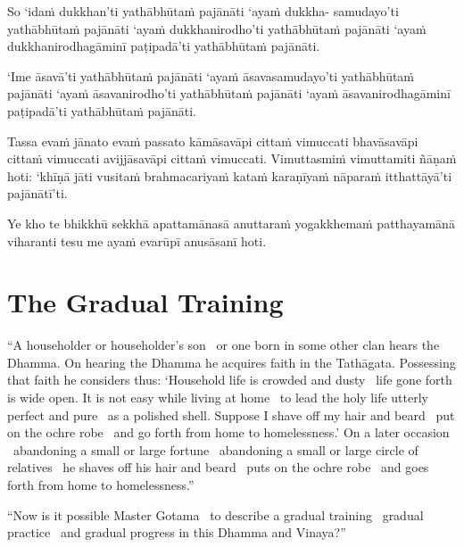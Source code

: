 So ‘idaṁ dukkhan’ti yathābhūtaṁ pajānāti ‘ayaṁ dukkha- samudayo’ti yathābhūtaṁ pajānāti ‘ayaṁ dukkhanirodho’ti yathābhūtaṁ pajānāti ‘ayaṁ dukkhanirodhagāminī paṭipadā’ti yathābhūtaṁ pajānāti.

‘Ime āsavā’ti yathābhūtaṁ pajānāti ‘ayaṁ āsavasamudayo’ti yathābhūtaṁ pajānāti ‘ayaṁ āsavanirodho’ti yathābhūtaṁ pajānāti ‘ayaṁ āsavanirodhagāminī paṭipadā’ti yathābhūtaṁ pajānāti.

Tassa evaṁ jānato evaṁ passato kāmāsavāpi cittaṁ vimuccati bhavāsavāpi cittaṁ vimuccati avijjāsavāpi cittaṁ vimuccati. Vimuttasmiṁ vimuttamiti ñāṇaṁ hoti: ‘khīṇā jāti vusitaṁ brahmacariyaṁ kataṁ karaṇīyaṁ nāparaṁ itthattāyā’ti pajānātī’ti.

\suttaRef{[MN 39]}

Ye kho te bhikkhū sekkhā apattamānasā anuttaraṁ yogakkhemaṁ patthayamānā viharanti tesu me ayaṁ evarūpī anusāsanī hoti.

\suttaRef{[MN 107]}

\clearpage

\section{The Gradual Training}
\label{gradual-training}

\begin{leader}
\end{leader}
“A householder or householder’s son \breathmark\ or one born in some other clan hears the Dhamma. On hearing the Dhamma he acquires faith in the Tathāgata. Possessing that faith he considers thus: ‘Household life is crowded and dusty \breathmark\ life gone forth is wide open. It is not easy while living at home \breathmark\ to lead the holy life utterly perfect and pure \breathmark\ as a polished shell. Suppose I shave off my hair and beard \breathmark\ put on the ochre robe \breathmark\ and go forth from home to homelessness.’ On a later occasion \breathmark\ abandoning a small or large fortune \breathmark\ abandoning a small or large circle of relatives \breathmark\ he shaves off his hair and beard \breathmark\ puts on the ochre robe \breathmark\ and goes forth from home to homelessness.”

\suttaRef{[MN 27 / 38 / 51]}

“Now is it possible Master Gotama \breathmark\ to describe a gradual training \breathmark\ gradual practice \breathmark\ and gradual progress in this Dhamma and Vinaya?”

